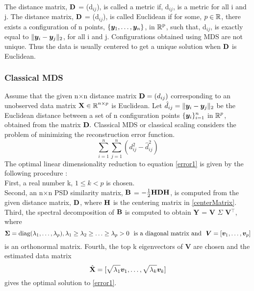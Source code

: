 The distance matrix, $\textbf{D}$ = (d$_{ij}$), is called a metric if, d$_{ij}$, is a metric for all i and j. The distance matrix, $\textbf{D}$ = (d$_{ij}$), is called Euclidean
if for some, $p \in \operatorname{\mathbb{R}}$, there exists a configuration of n points, $\{\boldsymbol{y}_{1}, \ldots, \boldsymbol{y}_{n} \}$, in $\operatorname{\mathbb{R}}^{\text{p}}$, such that, d$_{ij}$, is exactly equal to $\lVert\boldsymbol{y}_{i} - \boldsymbol{y}_{j}\rVert_{2}$, for all i and j.
Configurations obtained using MDS are not unique. Thus the data is usually
centered to get a unique solution when $\textbf{D}$ is Euclidean.


\subsubsection{Classical MDS}
Assume that the given n$\times$n distance matrix $\textbf{D} = (d_{ij})$ 
corresponding to an unobserved data matrix $\textbf{X} \in \operatorname{\mathbb{R}}^{n \times p}$ is Euclidean. Let $\hat{d}_{ij} = \lVert\boldsymbol{y}_{i} - \boldsymbol{y}_{j}\rVert_{2}$  be the Euclidean distance between a set of n configuration points 
$\displaystyle \{\boldsymbol{y}_{i}\}_{i=1}^{n}$ in $\operatorname{\mathbb{R}}^{p}$, obtained from the matrix $\textbf{D}.$ Classical MDS or classical scaling  considers the problem of minimizing the reconstruction error function.
\begin{equation}\label{error1}
\displaystyle \sum_{i = 1}^{n} \sum_{j=1}^{n} (d_{ij}^{2} - \hat{d}_{ij}^{2})
\end{equation}
The optimal linear dimensionality reduction to equation \eqref{error1} is given by the following procedure 
\cite{MardiaK.V1979Ma}:\\
First, a real number k, $1 \leq k < p$ is chosen.\\
Second, an n$\times$n PSD similarity matrix, $\textbf{B}$ = $-\frac{1}{2} \textbf{HDH}$,   is computed from the given distance matrix, $\textbf{D}$, where $\textbf{H}$ is the centering matrix in \eqref{centerMatrix}.\\
Third, the  spectral decomposition of $\textbf{B}$ is computed to 
obtain  \textbf{Y} = \textbf{V} \textbf{$\Sigma$} \textbf{V}$^{\top}$,
where 
\[
\bm{\Sigma} = \text{diag}(\lambda_{1}, \ldots, \lambda_{p}),
 \lambda_{1} \geq \lambda_{2} \geq \ldots \geq \lambda_{p} > 0 \ \
 \text{is a diagonal matrix and} \ \    \bm{V} = [\boldsymbol{v}_{1}, \ldots, \boldsymbol{v}_{p}]
 \]
is an orthonormal matrix.
Fourth, the top k eigenvectors of $\textbf{V}$ are chosen
and the estimated data matrix 
\[
\hat{\textbf{X}} = [\sqrt{\lambda_{1}}\boldsymbol{v}_{1}, \ldots, \sqrt{\lambda_{k}}\boldsymbol{v}_{k} ]
\]
gives the optimal solution to \eqref{error1}.\\

